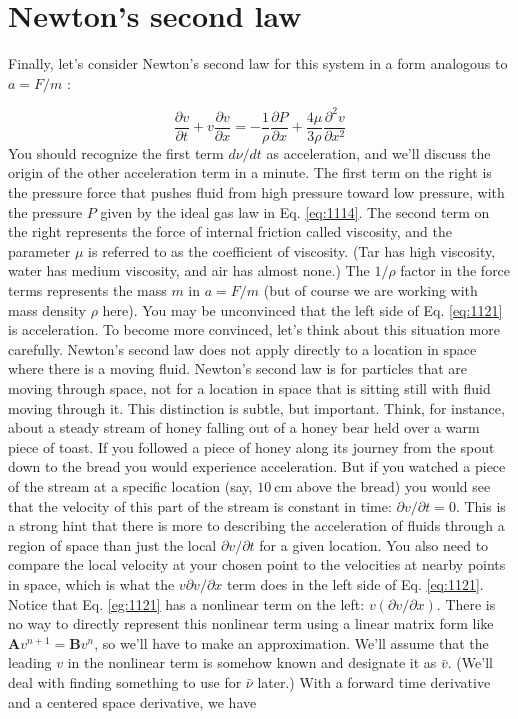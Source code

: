 \documentclass{book}
\theoremstyle{plain}
\theoremstyle{definition}
\numberwithin{exm}{chapter}
\theoremstyle{remark}
\theoremstyle{summary}
\theoremstyle{overview}
\begin{document}
\section*{Newton\rq s second law}
Finally, let\rq s consider Newton\rq s second law for this system in a form analogous to $a=F / m$ :

\begin{equation}\label{eq:1121}
\frac{\partial v}{\partial t}+v \frac{\partial v}{\partial x}=-\frac{1}{\rho} \frac{\partial P}{\partial x}+\frac{4 \mu}{3 \rho} \frac{\partial^{2} v}{\partial x^{2}}
\end{equation}
You should recognize the first term $d \nu / d t$ as acceleration, and we\rq ll discuss the origin of the other acceleration term in a minute. The first term on the right is the pressure force that pushes fluid from high pressure toward low pressure, with the pressure $P$ given by the ideal gas law in Eq. \eqref{eq:1114}. The second term on the right represents the force of internal friction called viscosity, and the parameter $\mu$ is referred to as the coefficient of viscosity. (Tar has high viscosity, water has medium viscosity, and air has almost none.) The $1 / \rho$ factor in the force terms represents the mass $m$ in $a=F / m$ (but of course we are working with mass density $\rho$ here).
You may be unconvinced that the left side of Eq. \eqref{eq:1121} is acceleration. To become more convinced, let\rq s think about this situation more carefully. Newton\rq s second law does not apply directly to a location in space where there is a moving fluid. Newton\rq s second law is for particles that are moving through space, not for a location in space that is sitting still with fluid moving through it. This distinction is subtle, but important. Think, for instance, about a steady stream of honey falling out of a honey bear held over a warm piece of toast. If you followed a piece of honey along its journey from the spout down to the bread you would experience acceleration. But if you watched a piece of the stream at a specific location (say, $10 \mathrm{~cm}$ above the bread) you would see that the velocity of this part of the stream is constant in time: $\partial v / \partial t=0$. This is a strong hint that there is more to describing the acceleration of fluids through a region of space than just the local $\partial v / \partial t$ for a given location. You also need to compare the local velocity at your chosen point to the velocities at nearby points in space, which is what the $v \partial v / \partial x$ term does in the left side of Eq. \eqref{eq:1121}.
Notice that Eq. \eqref{eg:1121} has a nonlinear term on the left: $v(\partial v / \partial x)$. There is no way to directly represent this nonlinear term using a linear matrix form like $\mathbf{A} v^{n+1}=\mathbf{B} v^{n}$, so we'll have to make an approximation. We\rq ll assume that the leading $v$ in the nonlinear term is somehow known and designate it as $\bar{v}$. (We\rq ll deal with finding something to use for $\bar{\nu}$ later.) With a forward time derivative and a centered space derivative, we have
\end{document}
